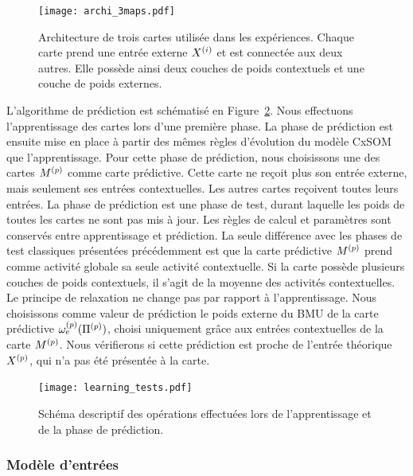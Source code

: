 \documentclass[../main]{subfiles}
\begin{document}
\begin{figure}
	\centering\texttt{[image: archi\_3maps.pdf]}
	\caption{Architecture de trois cartes utilisée dans les expériences. Chaque carte prend une entrée externe $X^{({i})}$ et est connectée aux deux autres. Elle possède ainsi deux couches de poids contextuels et une couche de poids externes.\label{fig:archi_3maps}}
\end{figure}

L'algorithme de prédiction est schématisé en Figure~\ref{fig:schema_pred}. 
Nous effectuons l'apprentissage des cartes lors d'une première phase.
La phase de prédiction est ensuite mise en place à partir des mêmes règles d'évolution du modèle CxSOM que l'apprentissage.
Pour cette phase de prédiction, nous choisissons une des cartes $M^{({p})}$ comme carte prédictive. Cette carte ne reçoit plus son entrée externe, mais seulement ses entrées contextuelles.  Les autres cartes reçoivent toutes leurs entrées.
La phase de prédiction est une phase de test, durant laquelle les poids de toutes les cartes ne sont pas mis à jour. Les règles de calcul et paramètres sont conservés entre apprentissage et prédiction.
La seule différence avec les phases de test classiques présentées précédemment est que la carte prédictive $M^{({p})}$ prend comme activité globale sa seule activité contextuelle.
Si la carte possède plusieurs couches de poids contextuels, il s'agit de la moyenne des activités contextuelles.
Le principe de relaxation ne change pas par rapport à l'apprentissage.
Nous choisissons comme valeur de prédiction le poids externe du BMU de la carte prédictive $\omega_{e}^{({p})}(\Pi^{({p})})$, choisi uniquement grâce aux entrées contextuelles de la carte $M^{({p})}$. 
Nous vérifierons si cette prédiction est proche de l'entrée théorique $X^{({p})}$, qui n'a pas été présentée à la carte.

\begin{figure}
	\texttt{[image: learning\_tests.pdf]}
	\caption{Schéma descriptif des opérations effectuées lors de l'apprentissage et de la phase de prédiction.\label{fig:schema_pred}}
\end{figure}

\subsubsection{Modèle d'entrées}
\end{document}
